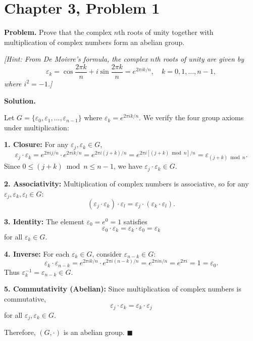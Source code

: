 \documentclass[12pt]{article}
\begin{document}
\section*{Chapter 3, Problem 1}

\textbf{Problem.} Prove that the complex $n$th roots of unity together with multiplication of complex numbers form an abelian group.

\textit{[Hint: From De Moivre's formula, the complex $n$th roots of unity are given by}
\[
\varepsilon_k = \cos\frac{2\pi k}{n} + i\sin\frac{2\pi k}{n} = e^{2\pi i k/n}, \quad k = 0, 1, \ldots, n-1,
\]
\textit{where $i^2 = -1$.]}

\bigskip
\textbf{Solution.}

Let $G = \{\varepsilon_0, \varepsilon_1, \ldots, \varepsilon_{n-1}\}$ where $\varepsilon_k = e^{2\pi i k/n}$. We verify the four group axioms under multiplication:

\medskip
\textbf{1. Closure:} For any $\varepsilon_j, \varepsilon_k \in G$,
\[
\varepsilon_j \cdot \varepsilon_k = e^{2\pi i j/n} \cdot e^{2\pi i k/n} = e^{2\pi i (j+k)/n} = e^{2\pi i [(j+k) \bmod n]/n} = \varepsilon_{(j+k) \bmod n}.
\]
Since $0 \le (j+k) \bmod n \le n-1$, we have $\varepsilon_j \cdot \varepsilon_k \in G$.

\medskip
\textbf{2. Associativity:} Multiplication of complex numbers is associative, so for any $\varepsilon_j, \varepsilon_k, \varepsilon_l \in G$:
\[
(\varepsilon_j \cdot \varepsilon_k) \cdot \varepsilon_l = \varepsilon_j \cdot (\varepsilon_k \cdot \varepsilon_l).
\]

\medskip
\textbf{3. Identity:} The element $\varepsilon_0 = e^{0} = 1$ satisfies
\[
\varepsilon_0 \cdot \varepsilon_k = \varepsilon_k \cdot \varepsilon_0 = \varepsilon_k
\]
for all $\varepsilon_k \in G$.

\medskip
\textbf{4. Inverse:} For each $\varepsilon_k \in G$, consider $\varepsilon_{n-k} \in G$:
\[
\varepsilon_k \cdot \varepsilon_{n-k} = e^{2\pi i k/n} \cdot e^{2\pi i (n-k)/n} = e^{2\pi i n/n} = e^{2\pi i} = 1 = \varepsilon_0.
\]
Thus $\varepsilon_k^{-1} = \varepsilon_{n-k} \in G$.

\medskip
\textbf{5. Commutativity (Abelian):} Since multiplication of complex numbers is commutative,
\[
\varepsilon_j \cdot \varepsilon_k = \varepsilon_k \cdot \varepsilon_j
\]
for all $\varepsilon_j, \varepsilon_k \in G$.

\medskip
Therefore, $(G, \cdot)$ is an abelian group. \hfill $\blacksquare$
\end{document}
